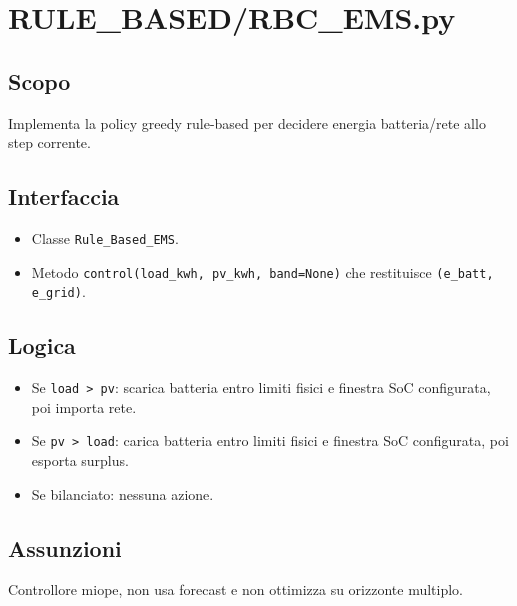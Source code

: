 \section{RULE\_BASED/RBC\_EMS.py}

\subsection*{Scopo}
Implementa la policy greedy rule-based per decidere energia batteria/rete allo step corrente.

\subsection*{Interfaccia}
\begin{itemize}[leftmargin=1.2cm]
\item Classe \texttt{Rule\_Based\_EMS}.
\item Metodo \texttt{control(load\_kwh, pv\_kwh, band=None)} che restituisce \texttt{(e\_batt, e\_grid)}.
\end{itemize}

\subsection*{Logica}
\begin{itemize}[leftmargin=1.2cm]
\item Se \texttt{load > pv}: scarica batteria entro limiti fisici e finestra SoC configurata, poi importa rete.
\item Se \texttt{pv > load}: carica batteria entro limiti fisici e finestra SoC configurata, poi esporta surplus.
\item Se bilanciato: nessuna azione.
\end{itemize}

\subsection*{Assunzioni}
Controllore miope, non usa forecast e non ottimizza su orizzonte multiplo.
